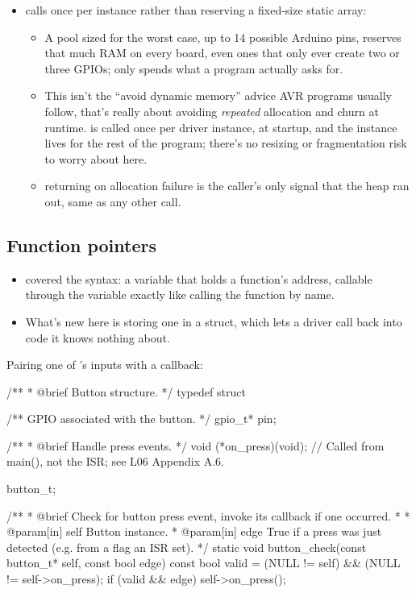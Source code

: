 \begin{itemize}
  \item {} calls  once per instance rather than reserving a
    fixed-size static array:
  \begin{itemize}
    \item A pool sized for the worst case, up to 14 possible Arduino pins, reserves that much RAM
      on every board, even ones that only ever create two or three GPIOs;  only
      spends what a program actually asks for.
    \item This isn't the ``avoid dynamic memory'' advice AVR programs usually follow, that's
      really about avoiding \emph{repeated} allocation and  churn at runtime.
       is called once per driver instance, at startup, and the instance lives
      for the rest of the program; there's no resizing or fragmentation risk to worry about here.
    \item {} returning  on allocation failure is the caller's only
      signal that the heap ran out, same as any other  call.
  \end{itemize}
\end{itemize}

\subsection{Function pointers}
\label{c10:a:4}
\begin{itemize}
  \item {} covered the syntax: a variable that holds a function's address, callable
    through the variable exactly like calling the function by name.
  \item What's new here is storing one in a struct, which lets a driver call back into code it
    knows nothing about.
\end{itemize}
Pairing one of 's  inputs with a callback:

\begin{ccode}
/**
 * @brief Button structure.
 */
typedef struct
{
    /** GPIO associated with the button. */
    gpio_t* pin;

    /**
     * @brief Handle press events.
     */
    void (*on_press)(void); // Called from main(), not the ISR; see L06 Appendix A.6.
} button_t;

/**
 * @brief Check for button press event, invoke its callback if one occurred.
 *
 * @param[in] self Button instance.
 * @param[in] edge True if a press was just detected (e.g. from a flag an ISR set).
 */
static void button_check(const button_t* self, const bool edge)
{
    const bool valid = (NULL != self) && (NULL != self->on_press);
    if (valid && edge) { self->on_press(); }
}
\end{ccode}

